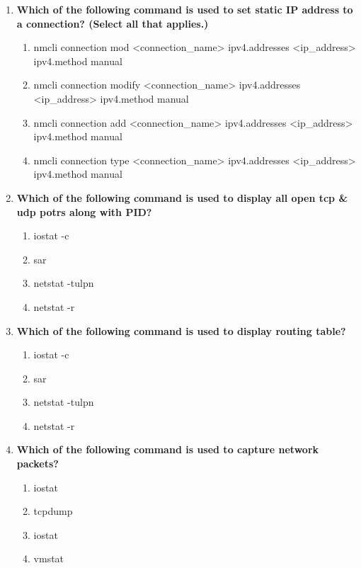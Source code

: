 \begin{flushleft}
\begin{enumerate}
		
		\item \textbf{Which of the following command is used to set static IP address to a connection? (Select all that applies.)}
		\begin{enumerate}[label=(\alph*)]
			\item nmcli connection mod <connection\_name> ipv4.addresses <ip\_address> ipv4.method manual   %
			\item nmcli connection modify <connection\_name> ipv4.addresses <ip\_address> ipv4.method manual  %
			\item nmcli connection add <connection\_name> ipv4.addresses <ip\_address> ipv4.method manual
			\item nmcli connection type <connection\_name> ipv4.addresses <ip\_address> ipv4.method manual
		\end{enumerate}
		\bigskip
		\bigskip	
		

		\item \textbf{Which of the following command is used to display all open tcp \& udp potrs along with PID?}
		\begin{enumerate}[label=(\alph*)]
			\item iostat -c 
			\item sar  
			\item netstat -tulpn   %
			\item netstat -r
		\end{enumerate}
		\bigskip
		\bigskip	
		
		
		\item \textbf{Which of the following command is used to display routing table?}
		\begin{enumerate}[label=(\alph*)]
			\item iostat -c 
			\item sar  
			\item netstat -tulpn   
			\item netstat -r    %
		\end{enumerate}
		\bigskip
		\bigskip	
		
		\item \textbf{Which of the following command is used to capture network packets?}
		\begin{enumerate}[label=(\alph*)]
			\item iostat
			\item tcpdump  %
			\item iostat
			\item vmstat
		\end{enumerate}
		\bigskip
		\bigskip	
		
		
		
	\end{enumerate}
\end{flushleft}


